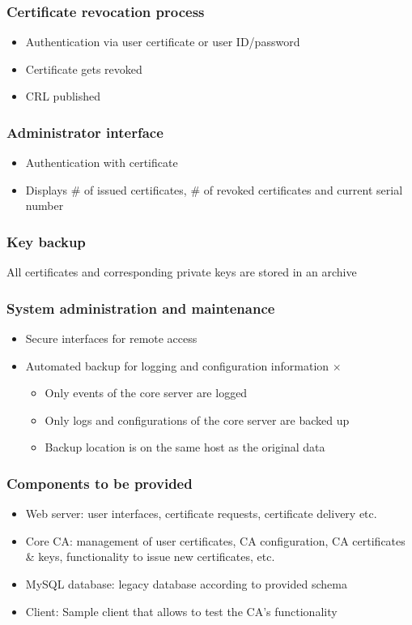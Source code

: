 \documentclass{report}
\begin{document}
\subsubsection{Certificate revocation process}
\begin{itemize}
\item Authentication via user certificate or user ID/password \checkmark
\item Certificate gets revoked \checkmark
\item CRL published \checkmark
\end{itemize}
\subsubsection{Administrator interface}
\begin{itemize}
\item Authentication with certificate \checkmark
\item Displays \# of issued certificates, \# of revoked certificates and current serial number \checkmark
\end{itemize}
\subsubsection{Key backup}
All certificates and corresponding private keys are stored in an archive \checkmark
\subsubsection{System administration and maintenance}
\begin{itemize}
\item Secure interfaces for remote access \checkmark
\item Automated backup for logging and configuration information $\times$
	\begin{itemize}
	\item Only events of the core server are logged
	\item Only logs and configurations of the core server are backed up
	\item Backup location is on the same host as the original data
	\end{itemize}
\end{itemize}
\subsubsection{Components to be provided}
\begin{itemize}
\item Web server: user interfaces, certificate requests, certificate delivery etc. \checkmark
\item Core CA: management of user certificates, CA configuration, CA certificates \& keys, functionality to issue new certificates, etc. \checkmark
\item MySQL database: legacy database according to provided schema \checkmark
\item Client: Sample client that allows to test the CA's functionality \checkmark
\end{itemize}
\end{document}
